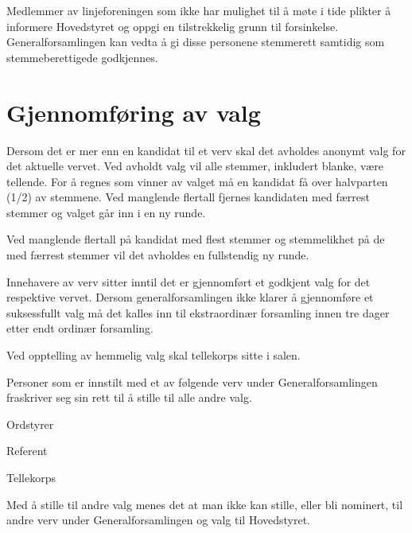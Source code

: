 Medlemmer av linjeforeningen som ikke har mulighet til å møte i tide plikter å informere Hovedstyret og oppgi en tilstrekkelig grunn til forsinkelse. Generalforsamlingen kan vedta å gi disse personene stemmerett samtidig som stemmeberettigede godkjennes.

\section{Gjennomføring av valg}{
Dersom det er mer enn en kandidat til et verv skal det avholdes anonymt valg for det aktuelle vervet. Ved
avholdt valg vil alle stemmer, inkludert blanke, være \linebreak tellende. For å regnes som vinner av valget må en kandidat få over halvparten (1/2) av stemmene. Ved manglende flertall fjernes kandidaten med færrest stemmer \linebreak og valget går inn i en ny runde. \newline

Ved manglende flertall på kandidat med flest stemmer og stemmelikhet på de med færrest stemmer vil det
avholdes en fullstendig ny runde. \newline

Innehavere av verv sitter inntil det er gjennomført et godkjent valg for det respektive vervet. Dersom
generalforsamlingen ikke klarer å gjennomføre et suksessfullt valg må det kalles inn til ekstraordinær
forsamling innen tre dager etter endt ordinær forsamling.

Ved opptelling av hemmelig valg skal tellekorps sitte i salen.

	 {
	Personer som er innstilt med et av følgende verv under Generalforsamlingen fraskriver seg sin rett til å stille til alle andre valg.
	\begin{liste}
		\item Ordstyrer
		\item Referent
		\item Tellekorps
	\end{liste}
	Med å stille til andre valg menes det at man ikke kan stille, eller
	bli nominert, til andre verv under Generalforsamlingen og valg til
	Hovedstyret.
	}
}
